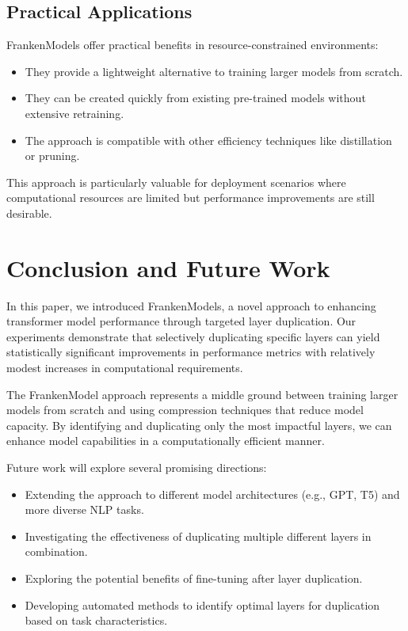 \documentclass{article}
\begin{document}
\subsection{Practical Applications}
FrankenModels offer practical benefits in resource-constrained environments:

\begin{itemize}
    \item They provide a lightweight alternative to training larger models from scratch.
    \item They can be created quickly from existing pre-trained models without extensive retraining.
    \item The approach is compatible with other efficiency techniques like distillation or pruning.
\end{itemize}

This approach is particularly valuable for deployment scenarios where computational resources are limited but performance improvements are still desirable.

\section{Conclusion and Future Work}
In this paper, we introduced FrankenModels, a novel approach to enhancing transformer model performance through targeted layer duplication. Our experiments demonstrate that selectively duplicating specific layers can yield statistically significant improvements in performance metrics with relatively modest increases in computational requirements.

The FrankenModel approach represents a middle ground between training larger models from scratch and using compression techniques that reduce model capacity. By identifying and duplicating only the most impactful layers, we can enhance model capabilities in a computationally efficient manner.

Future work will explore several promising directions:

\begin{itemize}
    \item Extending the approach to different model architectures (e.g., GPT, T5) and more diverse NLP tasks.
    \item Investigating the effectiveness of duplicating multiple different layers in combination.
    \item Exploring the potential benefits of fine-tuning after layer duplication.
    \item Developing automated methods to identify optimal layers for duplication based on task characteristics.
\end{itemize}
\end{document}
